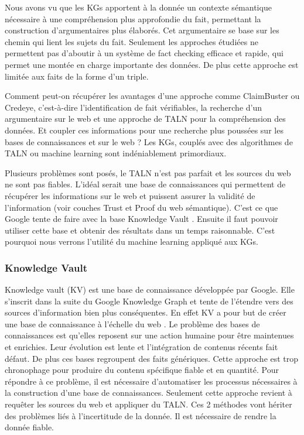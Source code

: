 Nous avons vu que les KGs apportent à la donnée un contexte sémantique nécessaire à une compréhension plus approfondie du fait, permettant la construction d'argumentaires plus élaborés. Cet argumentaire se base sur les chemin qui lient les sujets du fait. Seulement les approches étudiées ne permettent pas d'aboutir à un système de fact checking efficace et rapide, qui permet une montée en charge importante des données. De plus cette approche est limitée aux faits de la forme d'un triple.

Comment peut-on récupérer les avantages d'une approche comme ClaimBuster ou Credeye, c'est-à-dire l'identification de fait vérifiables, la recherche d'un argumentaire sur le web et une approche de TALN pour la compréhension des données. Et coupler ces informations pour une recherche plus poussées sur les bases de connaissances et sur le web ? Les KGs, couplés avec des algorithmes de TALN ou machine learning sont indéniablement primordiaux.

Plusieurs problèmes sont posés, le TALN n'est pas parfait et les sources du web ne sont pas fiables. L'idéal serait une base de connaissances qui permettent de récupérer les informations sur le web et puissent assurer la validité de l'information (voir couches Trust et Proof du web sémantique). C'est ce que Google tente de faire avec la base Knowledge Vault \cite{dong2014knowledge}. Ensuite il faut pouvoir utiliser cette base et obtenir des résultats dans un temps raisonnable. C'est pourquoi nous verrons l'utilité du machine learning appliqué aux KGs.

\subsubsection{Knowledge Vault}

Knowledge vault (KV) est une base de connaissance développée par Google. Elle s'inscrit dans la suite du Google Knowledge Graph et tente de l'étendre vers des sources d'information bien plus conséquentes. En effet KV a pour but de créer une base de connaissance à l'échelle du web \cite{dong2014knowledge}. Le problème des bases de connaissances est qu'elles reposent sur une action humaine pour être maintenues et enrichies. Leur évolution est lente et l'intégration de contenus récents fait défaut. De plus ces bases regroupent des faits génériques. Cette approche est trop chronophage pour produire du contenu spécifique fiable et en quantité. Pour répondre à ce problème, il est nécessaire d'automatiser les processus nécessaires à la construction d'une base de connaissances. Seulement cette approche revient à requêter les sources du web et appliquer du TALN. Ces 2 méthodes vont hériter des problèmes liés à l'incertitude de la donnée. Il est nécessaire de rendre la donnée fiable.

